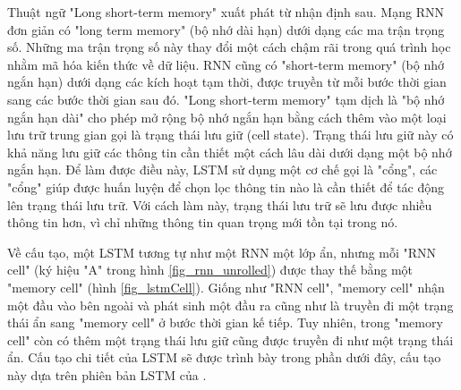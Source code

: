 Thuật ngữ "Long short-term memory" xuất phát từ nhận định sau. Mạng RNN đơn giản có "long term memory" (bộ nhớ dài hạn) dưới dạng các ma trận trọng số. Những ma trận trọng số này thay đổi một cách chậm rãi trong quá trình học nhằm mã hóa kiến thức về dữ liệu. RNN cũng có "short-term memory" (bộ nhớ ngắn hạn) dưới dạng các kích hoạt tạm thời, được truyền từ mỗi bước thời gian sang các bước thời gian sau đó. "Long short-term memory" tạm dịch là "bộ nhớ ngắn hạn dài" cho phép mở rộng bộ nhớ ngắn hạn bằng cách thêm vào một loại lưu trữ trung gian gọi là trạng thái lưu giữ (cell state). Trạng thái lưu giữ này có khả năng lưu giữ các thông tin cần thiết một cách lâu dài dưới dạng một bộ nhớ ngắn hạn. Để làm được điều này, LSTM sử dụng một cơ chế gọi là "cổng", các "cổng" giúp được huấn luyện để chọn lọc thông tin nào là cần thiết để tác động lên trạng thái lưu trữ. Với cách làm này, trạng thái lưu trữ sẽ lưu được nhiều thông tin hơn, vì chỉ những thông tin quan trọng mới tồn tại trong nó.

Về cấu tạo, một LSTM tương tự như một RNN một lớp ẩn, nhưng mỗi "RNN cell" (ký hiệu "A" trong hình \ref{fig_rnn_unrolled}) được thay thế bằng một "memory cell" (hình \ref{fig_lstmCell}). Giống như "RNN cell", "memory cell" nhận một đầu vào bên ngoài và phát sinh một đầu ra cũng như là truyền đi một trạng thái ẩn sang "memory cell" ở bước thời gian kế tiếp. Tuy nhiên, trong "memory cell" còn có thêm một trạng thái lưu giữ cũng được truyền đi như một trạng thái ẩn. Cấu tạo chi tiết của LSTM sẽ được trình bày trong phần dưới đây, cấu tạo này dựa trên phiên bản LSTM của \cite{gers2000}.

